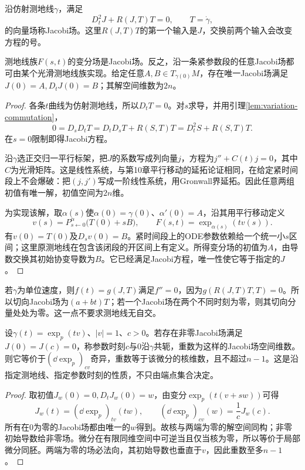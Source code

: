 \begin{definition}[Jacobi场]\label{def:jacobi-field}
沿仿射测地线$\gamma$，满足
\[
 D_t^2J+R(J,T)T=0,\qquad T=\dot\gamma,
\]
的向量场称Jacobi场。这里$R(J,T)T$的第一个输入是$J$，交换前两个输入会改变方程的号。
\end{definition}

\begin{theorem}[测地变分与Jacobi初值]\label{thm:jacobi-variation}
测地线族$F(s,t)$的变分场是Jacobi场。反之，沿一条紧参数段的任意Jacobi场都可由某个光滑测地线族实现。给定任意$A,B\in T_{\gamma(0)}M$，存在唯一Jacobi场满足$J(0)=A,D_tJ(0)=B$；其解空间维数为$2n$。
\end{theorem}
\begin{proof}
各条$t$曲线为仿射测地线，所以$D_tT=0$。对$s$求导，并用引理\ref{lem:variation-commutation}，
\[
 0=D_sD_tT=D_tD_sT+R(S,T)T=D_t^2S+R(S,T)T.
\]
在$s=0$限制即得Jacobi方程。

沿$\gamma$选正交归一平行标架，把$J$的系数写成列向量$j$，方程为$j''+C(t)j=0$，其中$C$为光滑矩阵。这是线性系统，与第10章平行移动的延拓论证相同，在给定紧时间段上不会爆破：把$(j,j')$写成一阶线性系统，用Gronwall界延拓。因此任意两组初值有唯一解，初值空间为$2n$维。

为实现该解，取$\alpha(s)$使$\alpha(0)=\gamma(0)$、$\alpha'(0)=A$，沿其用平行移动定义
\[
 v(s)=P^\alpha_{s\leftarrow0}\bigl(T(0)+sB\bigr),\qquad
 F(s,t)=\exp_{\alpha(s)}(tv(s)).
\]
有$v(0)=T(0)$及$D_sv(0)=B$。紧时间段上的ODE参数依赖给一个统一小$s$区间；这里原测地线在包含该闭段的开区间上有定义。所得变分场的初值为$A$，由导数交换其初始协变导数为$B$。它已经满足Jacobi方程，唯一性使它等于指定的$J$。
\end{proof}

若$\gamma$为单位速度，则$f(t)=g(J,T)$满足$f''=0$，因为$g(R(J,T)T,T)=0$。所以切向Jacobi场为$(a+bt)T$；若一个Jacobi场在两个不同时刻为零，则其切向分量处处为零。这一点不要求测地线无自交。

\begin{proposition}[指数微分与共轭点]\label{prop:conjugate-exponential}
设$\gamma(t)=\exp_p(tv)$、$|v|=1$、$c>0$。若存在非零Jacobi场满足$J(0)=J(c)=0$，称参数时刻$c$与0沿$\gamma$共轭，重数为这样的Jacobi场空间维数。则它等价于$(\dd\exp_p)_{cv}$奇异，重数等于该微分的核维数，且不超过$n-1$。这是沿指定测地线、指定参数时刻的性质，不只由端点集合决定。
\end{proposition}
\begin{proof}
取初值$J_w(0)=0,D_tJ_w(0)=w$，由变分$\exp_p(t(v+sw))$可得
\[
 J_w(t)=(\dd\exp_p)_{tv}(tw),\qquad
 (\dd\exp_p)_{cv}(w)=\frac1cJ_w(c).
\]
所有在0为零的Jacobi场都由唯一的$w$得到。故核与两端为零的解空间同构；非零初始导数给非零场。微分在有限同维空间中可逆当且仅当核为零，所以等价于局部微分同胚。两端为零的场必法向，其初始导数也垂直于$v$，因此重数至多$n-1$。
\end{proof}

